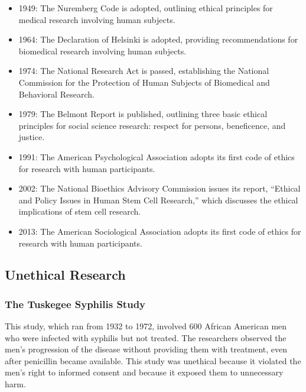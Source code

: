 \documentclass[
  b5paper]{book}
\providecommand{\tightlist}{%
  \setlength{\itemsep}{0pt}\setlength{\parskip}{0pt}}
\begin{document}
\begin{itemize}
\tightlist
\item
  1949: The Nuremberg Code is adopted, outlining ethical principles for medical research involving human subjects.
\item
  1964: The Declaration of Helsinki is adopted, providing recommendations for biomedical research involving human subjects.
\item
  1974: The National Research Act is passed, establishing the National Commission for the Protection of Human Subjects of Biomedical and Behavioral Research.
\item
  1979: The Belmont Report is published, outlining three basic ethical principles for social science research: respect for persons, beneficence, and justice.
\item
  1991: The American Psychological Association adopts its first code of ethics for research with human participants.
\item
  2002: The National Bioethics Advisory Commission issues its report, ``Ethical and Policy Issues in Human Stem Cell Research,'' which discusses the ethical implications of stem cell research.
\item
  2013: The American Sociological Association adopts its first code of ethics for research with human participants.
\end{itemize}

\hypertarget{unethical-research}{%
\subsection*{Unethical Research}\label{unethical-research}}

\hypertarget{the-tuskegee-syphilis-study}{%
\subsubsection*{The Tuskegee Syphilis Study}\label{the-tuskegee-syphilis-study}}

This study, which ran from 1932 to 1972, involved 600 African American men who were infected with syphilis but not treated. The researchers observed the men's progression of the disease without providing them with treatment, even after penicillin became available. This study was unethical because it violated the men's right to informed consent and because it exposed them to unnecessary harm.
\end{document}
